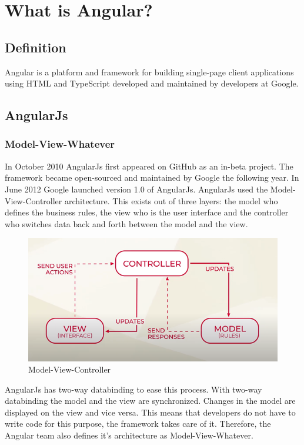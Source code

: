 \section{What is Angular?}
\subsection{Definition}
Angular is a platform and framework for building single-page client applications using HTML and TypeScript developed and maintained by developers at Google.
\autocite{Angular.io}

\subsection{AngularJs}
\subsubsection{Model-View-Whatever}
In October 2010 AngularJs first appeared on GitHub as an in-beta project. The framework became open-sourced and maintained by Google the following year. In June 2012 Google launched version 1.0 of AngularJs. \autocite{Brandrick2017} AngularJs used the Model-View-Controller architecture. This exists out of three layers: the model who defines the business rules, the view who is the user interface and the controller who switches data back and forth between the model and the view.
\autocite{AltexSoft}

\begin{figure}[h!]
    \caption{Model-View-Controller}
    \centering
    \includegraphics[width=\textwidth]{img/mvc.png} 
\end{figure}

AngularJs has two-way databinding to ease this process. With two-way databinding the model and the view are synchronized. Changes in the model are displayed on the view and vice versa. This means that developers do not have to write code for this purpose, the framework takes care of it. Therefore, the Angular team also defines it's architecture as Model-View-Whatever.

